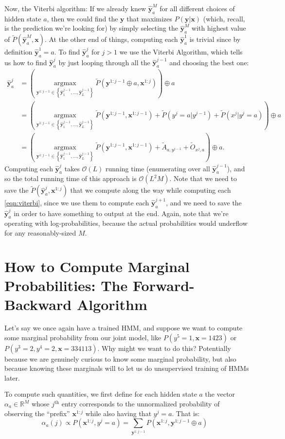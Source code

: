\documentclass{article}
\DeclareMathOperator{\argmax}{argmax}
\newcommand{\Yh}{\hat{\textbf{y}}}
\newcommand{\Pt}{\tilde{P}}
\newcommand{\At}{\tilde{A}}
\newcommand{\Ot}{\tilde{O}}
\newcommand{\bigO}{\mathcal{O}}
\newcommand{\x}{\textbf{x}}
\newcommand{\y}{\textbf{y}}
\begin{document}
Now, the Viterbi algorithm: If we already knew $\Yh^M_a$ for all different choices of hidden state $a$, then we could find the $\y$ that maximizes $P(\y|\x)$ (which, recall, is the prediction we're looking for) by simply selecting the $\Yh^M_a$ with highest value of $\Pt(\Yh^M_a,\x)$.  
At the other end of things, computing each $\Yh_a^1$ is trivial since by definition $\Yh_a^1 = a$.  To find $\Yh^j_a$ for $j > 1$ we use the Viterbi Algorithm, which tells us how to find $\Yh^j_a$ by just looping through all the $\Yh^{j-1}_a$ and choosing the best one:
\begin{align}
\Yh^j_a &= \left(\underset{\y^{1:j-1} \in \left\{\Yh^{j-1}_1,\ldots,\Yh^{j-1}_L\right\}}{\argmax} \Pt(\y^{1:j-1}\oplus a,\x^{1:j})\right) \oplus a\label{eqn:viterbi}\\
       & = \left(\underset{\y^{1:j-1} \in \left\{\Yh^{j-1}_1,\ldots,\Yh^{j-1}_L\right\}}{\argmax} \Pt(\y^{1:j-1},\x^{1:j-1}) + \Pt(y^j=a|y^{j-1}) + \Pt(x^j|y^j=a)\right) \oplus a\nonumber\\
       & = \left(\underset{\y^{1:j-1} \in \left\{\Yh^{j-1}_1,\ldots,\Yh^{j-1}_L\right\}}{\argmax} \Pt(\y^{1:j-1},\x^{1:j-1}) + \At_{a,y^{j-1}} + \Ot_{x^j,a}\right) \oplus a\nonumber.
\end{align}
Computing each $\Yh_a^j$ takes $\bigO(L)$ running time (enumerating over all $\Yh_a^{j-1}$), and so the total running time of this approach is $\bigO(L^2M)$.  Note that we need to save the $\Pt(\Yh_a^j,\x^{1:j})$ that we compute along the way while computing each \eqref{eqn:viterbi}, since we use them to compute each $\Yh_a^{j+1}$, and we need to save the $\Yh_a^j$ in order to have something to output at the end.  Again, note that we're operating with log-probabilities, because the actual probabilities would underflow for any reasonably-sized $M$.


\section{How to Compute Marginal Probabilities: The Forward-Backward Algorithm}

Let's say we once again have a trained HMM, and suppose we  want to compute some marginal probability from our joint model, like $P(y^5=1,\x = 1423)$ or $P(y^3=2, y^4=2,\x = 334113)$.  Why might we want to do this?  Potentially because we are genuinely curious to know some marginal probability, but also because knowing these marginals will to let us do unsupervised training of HMMs later.

To compute such quantities, we first define for each hidden state $a$ the vector $\alpha_a \in \mathbb{R}^M$ whose $j^\text{th}$ entry corresponds to the unnormalized probability of observing the ``prefix'' $\textbf{x}^{1:j}$ while also having that $y^j = a$. That is:
$$\alpha_a(j) \propto P(\x^{1:j},y^j= a) = \sum_{\y^{1:j-1}} P(\x^{1:j}, \y^{1:j-1}\oplus a)\ \ \ $$
\end{document}
